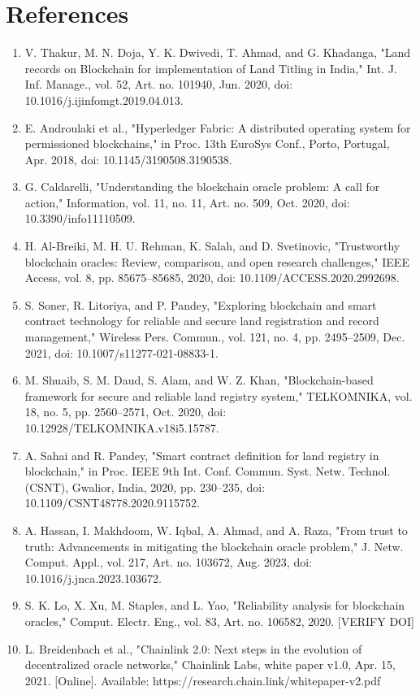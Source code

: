 \documentclass[10pt]{article}
\begin{document}
\section*{References}\footnotesize
\begin{enumerate}
\item V. Thakur, M. N. Doja, Y. K. Dwivedi, T. Ahmad, and G. Khadanga, "Land records on Blockchain for implementation of Land Titling in India," Int. J. Inf. Manage., vol. 52, Art. no. 101940, Jun. 2020, doi: 10.1016/j.ijinfomgt.2019.04.013.
\item E. Androulaki et al., "Hyperledger Fabric: A distributed operating system for permissioned blockchains," in Proc. 13th EuroSys Conf., Porto, Portugal, Apr. 2018, doi: 10.1145/3190508.3190538.
\item G. Caldarelli, "Understanding the blockchain oracle problem: A call for action," Information, vol. 11, no. 11, Art. no. 509, Oct. 2020, doi: 10.3390/info11110509.
\item H. Al-Breiki, M. H. U. Rehman, K. Salah, and D. Svetinovic, "Trustworthy blockchain oracles: Review, comparison, and open research challenges," IEEE Access, vol. 8, pp. 85675–85685, 2020, doi: 10.1109/ACCESS.2020.2992698.
\item S. Soner, R. Litoriya, and P. Pandey, "Exploring blockchain and smart contract technology for reliable and secure land registration and record management," Wireless Pers. Commun., vol. 121, no. 4, pp. 2495–2509, Dec. 2021, doi: 10.1007/s11277-021-08833-1.
\item M. Shuaib, S. M. Daud, S. Alam, and W. Z. Khan, "Blockchain-based framework for secure and reliable land registry system," TELKOMNIKA, vol. 18, no. 5, pp. 2560–2571, Oct. 2020, doi: 10.12928/TELKOMNIKA.v18i5.15787.
\item A. Sahai and R. Pandey, "Smart contract definition for land registry in blockchain," in Proc. IEEE 9th Int. Conf. Commun. Syst. Netw. Technol. (CSNT), Gwalior, India, 2020, pp. 230–235, doi: 10.1109/CSNT48778.2020.9115752.
\item A. Hassan, I. Makhdoom, W. Iqbal, A. Ahmad, and A. Raza, "From trust to truth: Advancements in mitigating the blockchain oracle problem," J. Netw. Comput. Appl., vol. 217, Art. no. 103672, Aug. 2023, doi: 10.1016/j.jnca.2023.103672.
\item S. K. Lo, X. Xu, M. Staples, and L. Yao, "Reliability analysis for blockchain oracles," Comput. Electr. Eng., vol. 83, Art. no. 106582, 2020. [VERIFY DOI]
\item L. Breidenbach et al., "Chainlink 2.0: Next steps in the evolution of decentralized oracle networks," Chainlink Labs, white paper v1.0, Apr. 15, 2021. [Online]. Available: https://research.chain.link/whitepaper-v2.pdf

\end{enumerate}
\end{document}
